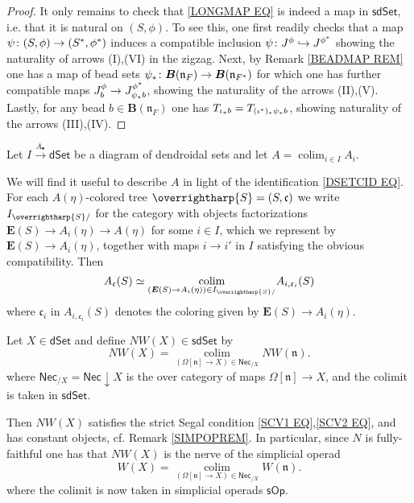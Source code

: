 \documentclass{hha}
\theoremstyle{definition} %
\newcommand{\vect}[1]{\text{\overrightharp{\ensuremath{#1}}}}
\DeclareMathOperator{\colim}{colim}
\begin{document}
\begin{proof}
	It only remains to check that
	\eqref{LONGMAP EQ}
	is indeed a map in 
	$\mathsf{sdSet}$, i.e. that it is natural on 
	$(S,\phi)$.
	To see this, one first readily checks that a map
	$\psi \colon (S,\phi) \to (S^{\**},\phi^{\**})$
	induces a compatible inclusion
	$\psi \colon J^{\phi} \hookrightarrow J^{\phi^{\**}}$
	showing the naturality of arrows (I),(VI) 
	in the zigzag.
%
	Next, by Remark \ref{BEADMAP REM}
	one has a map of bead sets
	$\psi_{\**} \colon 
	\boldsymbol{B}(\mathfrak{n}_{F})
	\to
	\boldsymbol{B}(\mathfrak{n}_{F^{\**}})$
	for which one has further compatible maps
	$J^{\phi}_b
	\to 
	J^{\phi^{\**}}_{\psi_{\**}b}$,
	showing the naturality of the arrows (II),(V).
	Lastly, for any bead 
	$b \in \boldsymbol{B}(\mathfrak{n}_{F})$
	one has
	$T_{\iota_{\**}b} = T_{(\iota^{\**})_{\**} \psi_{\**}b}$,
	showing naturality of the arrows (III),(IV).
\end{proof}



\begin{remark}\label{PREOPCOLEV REM}
	Let $I \xrightarrow{A_{\bullet}} \mathsf{dSet}$
	be a diagram of dendroidal sets and let
	$A = \colim_{i \in I} A_i$.

	We will find it useful to describe $A$
	in light of the identification \eqref{DSETCID EQ}.
	For each $A(\eta)$-colored tree 
	$\vect{S} = (S,\mathfrak{c})$
	we write
	$I_{\vect{S}/}$
	for the category with objects factorizations
	$\boldsymbol{E}(S) \to A_i(\eta) \to A(\eta)$ 
	for some $i \in I$,
	which we represent by 
	$\boldsymbol{E}(S) \to A_i(\eta)$,
	together with maps $i \to i'$ in $I$
	satisfying the obvious compatibility.
%	
	Then
\begin{equation}\label{COLIMALT EQ}
	A_{\mathfrak{c}}(S) \simeq 
	\underset{(\boldsymbol{E}(S) \to A_i(\eta)) \in I_{\vect{S}/}}{\colim}
	A_{i,
	\mathfrak{c}_i}(S)
\end{equation}
	where $\mathfrak{c}_i$ in 
	$A_{i,\mathfrak{c}_i}(S)$
	denotes the coloring given by
	$\boldsymbol{E}(S) \to A_i(\eta)$.
\end{remark}



\begin{proposition}\label{NWKANEX_PROP}
	Let $X \in \mathsf{dSet}$ and define
	$NW(X) \in \mathsf{sdSet}$ by
	\begin{equation}\label{NWKANEX EQ}
	NW(X) =
	\underset{(\Omega[\mathfrak{n}] \to X)
		\in \mathsf{Nec}_{/X}}{\colim}
	NW(\mathfrak{n}).
	\end{equation}
	where
	$\mathsf{Nec}_{/X} = \mathsf{Nec} \downarrow X$ is the over category of maps $\Omega[\mathfrak{n}] \to X$, and
	the colimit is taken in $\mathsf{sdSet}$.

	Then $NW(X)$ satisfies the strict Segal condition
	\eqref{SCV1 EQ},\eqref{SCV2 EQ},
	and has constant objects, cf. Remark \ref{SIMPOPREM}.
	In particular, since $N$ is fully-faithful one has that
	$NW(X)$ is the nerve of the simplicial operad
\[
	W(X) =
	\underset{
	(\Omega[\mathfrak{n}] \to X)
	\in \mathsf{Nec}_{/X}}{\colim}
	W(\mathfrak{n}).
\]
	where the colimit is now taken in simplicial operads
	$\mathsf{sOp}$.
\end{proposition}
\end{document}
